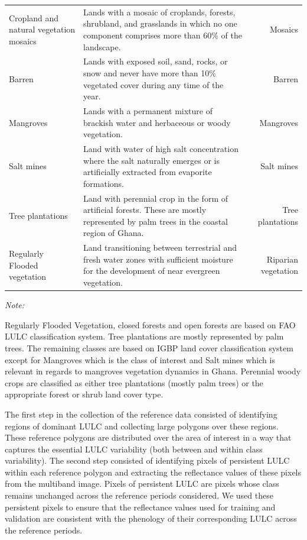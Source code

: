 \documentclass[12pt,oneside,preprint,3p,authoryear,times]{elsarticle} %
\begin{document}
\begin{table}[H]
{\begin{threeparttable}
\begin{tabular}[t]{l>{\raggedright\arraybackslash}p{35em}r}
\addlinespace
Cropland and natural vegetation mosaics & Lands with a mosaic of croplands, forests, shrubland, and grasslands in which no one component comprises more than 60\% of the landscape. & Mosaics\\
\addlinespace
Barren & Lands with exposed soil, sand, rocks, or snow and never have more than 10\% vegetated cover during any time of the year. & Barren\\
\addlinespace
Mangroves & Lands with a permanent mixture of brackish water and herbaceous or woody vegetation. & Mangroves\\
\addlinespace
Salt mines & Land with water of high salt concentration where the salt naturally emerges or is artificially extracted from evaporite formations. & Salt mines\\
\addlinespace
Tree plantations & Land with perennial crop in the form of artificial forests. These are mostly represented by palm trees in the coastal region of Ghana. & Tree plantations\\
\addlinespace
Regularly Flooded vegetation & Land transitioning between terrestrial and fresh water zones with sufficient moisture for the development of near evergreen vegetation. & Riparian vegetation\\
\bottomrule
\end{tabular}
\begin{tablenotes}
\item \textit{Note: } 
\item Regularly Flooded Vegetation, closed forests and open forests are based on FAO LULC classification system. Tree plantations are mostly represented by palm trees. The remaining classes are based on IGBP land cover classification system except for Mangroves which is the class of interest and Salt mines which is relevant in regards to mangroves vegetation dynamics in Ghana. Perennial woody crops are classified as either tree plantations (mostly palm trees) or the appropriate forest or shrub land cover type.
\end{tablenotes}
\end{threeparttable}}
\end{table}

The first step in the collection of the reference data consisted of
identifying regions of dominant LULC and collecting large polygons over
these regions. These reference polygons are distributed over the area of
interest in a way that captures the essential LULC variability (both
between and within class variability). The second step consisted of
identifying pixels of persistent LULC within each reference polygon and
extracting the reflectance values of these pixels from the multiband
image. Pixels of persistent LULC are pixels whose class remains
unchanged across the reference periods considered. We used these
persistent pixels to ensure that the reflectance values used for
training and validation are consistent with the phenology of their
corresponding LULC across the reference periods.
\end{document}

